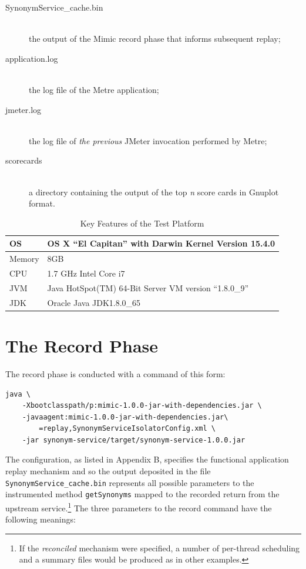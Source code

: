 \documentclass[]{final_report}
\begin{document}
\begin{description}
\item[SynonymService\_cache.bin] \hfill \\ the output of the Mimic record phase that informs subsequent replay;
\item[application.log] \hfill \\  the log file of the Metre application;
\item[jmeter.log] \hfill \\  the log file of \textit{the previous} JMeter invocation performed by Metre;
\item[scorecards] \hfill \\  a directory containing the output of the top \textit{n} score cards in Gnuplot format.
\end{description}

\begin{table}
\begin{center}
\begin{tabular}{ll}
\hline
OS & OS X ``El Capitan'' with Darwin Kernel Version 15.4.0 \\ \hline
Memory & 8GB \\ \hline
CPU & 1.7 GHz Intel Core i7 \\ \hline
JVM & Java HotSpot(TM) 64-Bit Server VM version ``1.8.0\_9'' \\ \hline
JDK & Oracle Java JDK1.8.0\_65 \\ \hline
\end{tabular}
\caption{Key Features of the Test Platform}
\end{center}
\label{table:key_features_test}
\end{table}

\FloatBarrier

\section*{The Record Phase}

The record phase is conducted with a command of this form:

\begin{lstlisting}
java \
    -Xbootclasspath/p:mimic-1.0.0-jar-with-dependencies.jar \
    -javaagent:mimic-1.0.0-jar-with-dependencies.jar\
        =replay,SynonymServiceIsolatorConfig.xml \
    -jar synonym-service/target/synonym-service-1.0.0.jar
\end{lstlisting}

The configuration, as listed in Appendix B, specifies the functional application replay mechanism and so the output deposited in the file \lstinline{SynonymService_cache.bin}\noop{} represents all possible parameters to the instrumented method \lstinline{getSynonyms}\noop{} mapped to the recorded return from the upstream service.\footnote{If the \textit{reconciled} mechanism were specified, a number of per-thread scheduling and a summary files would be produced as in other examples.} The three parameters to the record command have the following meanings:
\end{document}
